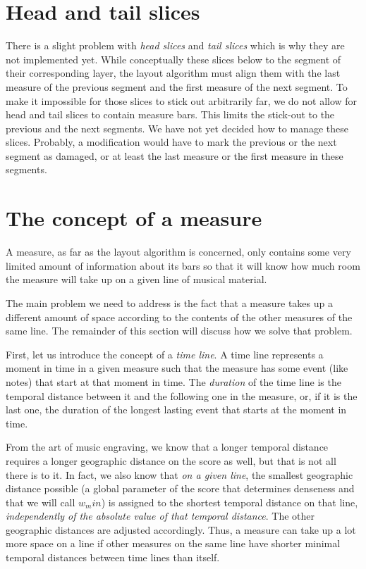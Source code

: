 \documentclass[11pt]{book}
\begin{document}
\section{Head and tail slices}

There is a slight problem with \emph{head slices} and \emph{tail
slices} which is why they are not implemented yet.  While
conceptually these slices below to the segment of their
corresponding layer, the layout algorithm must align them with the
last measure of the previous segment and the first measure of the
next segment.  To make it impossible for those slices to stick out
arbitrarily far, we do not allow for head and tail slices to contain
measure bars.  This limits the stick-out to the previous and the
next segments.  We have not yet decided how to manage these slices.
Probably, a modification would have to mark the previous or the next
segment as damaged, or at least the last measure or the first measure
in these segments.  

\section{The concept of a measure}

A measure, as far as the layout algorithm is concerned, only contains
some very limited amount of information about its bars so that it will
know how much room the measure will take up on a given line of musical
material. 

The main problem we need to address is the fact that a measure takes
up a different amount of space according to the contents of the other
measures of the same line.  The remainder of this section will discuss
how we solve that problem.

First, let us introduce the concept of a \emph{time line}. A time line represents a moment in time in a given measure such
that the measure has some event (like notes) that start at that moment
in time.  The \emph{duration} of the
time line is the temporal distance between it and the following one in
the measure, or, if it is the last one, the duration of the longest
lasting event that starts at the moment in time. 

From the art of music engraving, we know that a longer temporal
distance requires a longer geographic distance on the score as well,
but that is not all there is to it.  In fact, we also know that
\emph{on a given line}, the smallest geographic distance possible (a
global parameter of the score that determines denseness and that we
will call $w_min$) is assigned to the shortest temporal distance on
that line, \emph{independently of the absolute value of that temporal
distance}. The other geographic distances are adjusted accordingly.
Thus, a measure can take up a lot more space on a line if other
measures on the same line have shorter minimal temporal distances
between time lines than itself.
\end{document}
